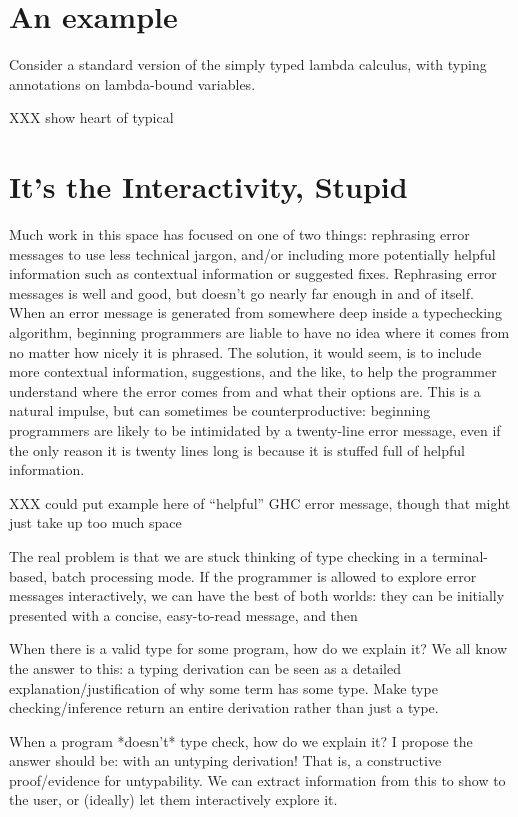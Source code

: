 \documentclass[sigplan, screen]{acmart}\settopmatter{printccs=false,printacmref=false}
\begin{document}
\section{An example}

Consider a standard version of the simply typed lambda calculus, with
typing annotations on lambda-bound variables.

XXX show heart of typical 


\section{It's the Interactivity, Stupid}

Much work in this space has focused on one of two things: rephrasing
error messages to use less technical jargon, and/or including more
potentially helpful information such as contextual information or
suggested fixes.  Rephrasing error messages is well and good, but
doesn't go nearly far enough in and of itself.  When an error message
is generated from somewhere deep inside a typechecking algorithm,
beginning programmers are liable to have no idea where it comes from
no matter how nicely it is phrased.  The solution, it would seem, is
to include more contextual information, suggestions, and the like, to
help the programmer understand where the error comes from and what
their options are.  This is a natural impulse, but can sometimes be
counterproductive: beginning programmers are likely to be intimidated
by a twenty-line error message, even if the only reason it is twenty
lines long is because it is stuffed full of helpful information.

XXX could put example here of ``helpful'' GHC error message, though
that might just take up too much space

The real problem is that we are stuck thinking of type checking in a
terminal-based, batch processing mode.  If the programmer is allowed
to explore error messages interactively, we can have the best of both
worlds: they can be initially presented with a concise, easy-to-read
message, and then 





When there is a valid type for some program, how do we explain it?  We all know the answer to this: a typing derivation can be seen as a detailed explanation/justification of why some term has some type.  Make type checking/inference return an entire derivation rather than just a type.

When a program *doesn't* type check, how do we explain it?  I propose the answer should be: with an untyping derivation!  That is, a constructive proof/evidence for untypability.  We can extract information from this to show to the user, or (ideally) let them interactively explore it.
\end{document}
